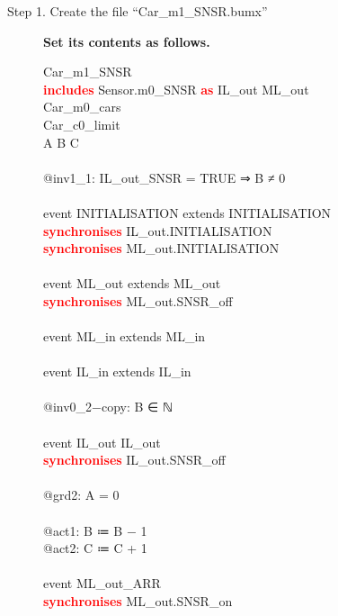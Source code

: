 \begin{description}
	\item[Step 1. Create the file ``Car\_m1\_SNSR.bumx''] \textbf{Set its contents as follows.}
	
		\begin{center}
		\begin{Bcode}
			\Bmachine{} Car_m1_SNSR\\
			\textcolor{red}{\textbf{includes}} Sensor.m0_SNSR \textcolor{red}{\textbf{as}} IL_out ML_out\\
			\Brefines{} Car_m0_cars\\
			\Bsees{} Car_c0_limit\\
			\Bvariables{} A B C\\
			\Binvariants\\
			@inv1_1: IL_out_SNSR = TRUE ⇒ B ≠ 0\\
			\Bevents\\
			event INITIALISATION extends INITIALISATION\\
			\textcolor{red}{\textbf{synchronises}} IL_out.INITIALISATION\\
			\textcolor{red}{\textbf{synchronises}} ML_out.INITIALISATION\\
			\Bend\\
			event ML_out extends ML_out\\
			\textcolor{red}{\textbf{synchronises}} ML_out.SNSR_off\\
			\Bend\\
			event ML_in extends ML_in\\
			\Bend\\
			event IL_in extends IL_in\\
			\Bwhere\\
			\Btheorem{} @inv0_2−copy: B ∈ ℕ \\
			\Bend\\
			event IL_out \Brefines{} IL_out\\
			\textcolor{red}{\textbf{synchronises}} IL_out.SNSR_off\\
			\Bwhere\\
			@grd2: A = 0\\
			\Bthen\\
			@act1: B ≔ B − 1\\
			@act2: C ≔ C + 1\\
			\Bend\\
			event ML_out_ARR\\
			\textcolor{red}{\textbf{synchronises}} ML_out.SNSR_on\\
			\Bend\\

\end{Bcode}
\end{center}
\end{description}
